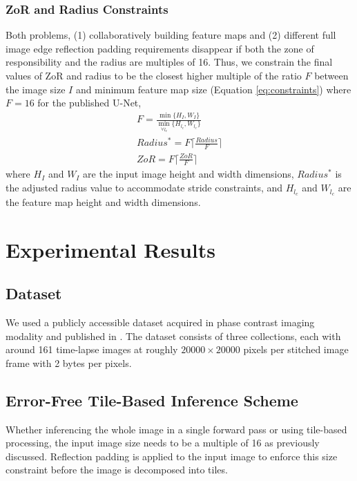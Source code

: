\documentclass[runningheads]{llncs}
\begin{document}
\subsubsection{ZoR and Radius Constraints}

Both problems, (1) collaboratively building feature maps and (2) different full image edge reflection padding requirements disappear if both the zone of responsibility and the radius are multiples of 16. Thus, we constrain the final values of ZoR and radius to be the closest higher multiple of the ratio $F$ between the image size $I$ and minimum feature map size (Equation \ref{eq:constraints}) where $F=16$ for the published U-Net, 
\begin{equation}
\begin{aligned}
F = \frac{ \min\{H_{I}, W_{I} \} }{ \min_{\forall l_{c}} \{ H_{l_{c}}, W_{l_{c}} \} } \\
Radius^{*} = F \lceil \frac{Radius}{F} \rceil \\
ZoR = F \lceil \frac{ZoR}{F} \rceil 
\end{aligned}
\label{eq:constraints}
\end{equation}
where $H_{I}$ and $W_{I}$ are the input image height and width dimensions, $Radius^{*}$ is the adjusted radius value to accommodate stride constraints, and $H_{l_{c}}$ and $W_{l_{c}}$ are the feature map height and width dimensions. 

\section{Experimental Results}
\label{experimental-results}

\subsection{Dataset}
\label{dataset}

We used a publicly accessible dataset acquired in phase contrast imaging modality and published in \cite{Bhadriraju2016}. 
The dataset consists of three collections, each with around 161 time-lapse images at roughly $\num{20000} \times \num{20000}$  pixels per stitched image frame with 2 bytes per pixels. 


\subsection{Error-Free Tile-Based Inference Scheme}

Whether inferencing the whole image in a single forward pass or using tile-based processing, the input image size needs to be a multiple of 16 as previously discussed. Reflection padding is applied to the input image to enforce this size constraint before the image is decomposed into tiles. 
\end{document}
